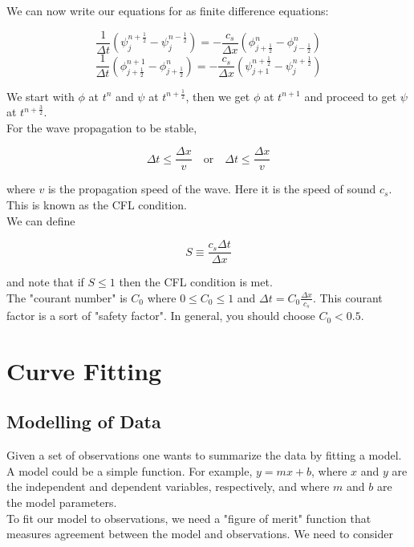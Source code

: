 \documentclass[]{article}
\begin{document}
We can now write our equations for as finite difference equations:

\[\frac{1}{\Delta t} (\psi_j^{n + \frac{1}{2}} - \psi_j^{n - \frac{1}{2}}) = -\frac{c_s}{\Delta x} ( \phi^n_{j+\frac{1}{2}} - \phi^n_{j-\frac{1}{2}})\]
\[\frac{1}{\Delta t} (\phi^{n+1}_{j+\frac{1}{2}} - \phi^n_{j+\frac{1}{2}}) = -\frac{c_s}{\Delta x} (\psi_{j+1}^{n + \frac{1}{2}} - \psi_j^{n + \frac{1}{2}})\]

We start with $\phi$ at $t^n$ and $\psi$ at $t^{n+\frac{1}{2}}$, then we get $\phi$ at $t^{n+1}$ and proceed to get $\psi$ at $t^{n+\frac{3}{2}}$.\\

For the wave propagation to be stable, 

\[\Delta t \leq \frac{\Delta x}{v} \quad \text{or} \quad \Delta t \leq \frac{\Delta x}{v}\]

where $v$ is the propagation speed of the wave. Here it is the speed of sound $c_s$. This is known as the CFL condition.\\

We can define 

\[S \equiv \frac{c_s \Delta t}{\Delta x}\]

and note that if $S \leq 1$ then the CFL condition is met.\\

The "courant number" is $C_0$ where $0 \leq C_0 \leq 1$ and $\Delta t = C_0 \frac{\Delta x}{c_s}$. This courant factor is a sort of "safety factor". In general, you should choose $C_0 < 0.5$.\\


\section{Curve Fitting}\bigbreak\bigbreak

\subsection{Modelling of Data}\bigbreak

Given a set of observations one wants to summarize the data by fitting a model.\\ 

A model could be a simple function. For example, $y=mx+b$, where $x$ and $y$ are the independent and dependent variables, respectively, and where $m$ and $b$ are the model parameters.\\

To fit our model to observations, we need a "figure of merit" function that measures agreement between the model and observations. We need to consider 
\end{document}
